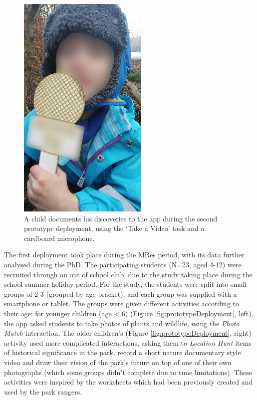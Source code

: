 \begin{figure}
  \centering
  \includegraphics[width=0.35\columnwidth]{images/chapter04/microphone.png}
  \caption[A child completing a `Take a Video' Task]{A child documents his discoveries to the app during the second prototype deployment, using the `Take a Video' task and a cardboard microphone.}
  \label{fig:prototypeMicrophone}
\end{figure}

The first deployment took place during the MRes period, with its data further analysed during the PhD. The participating students (N=23, aged 4-12) were recruited through an out of school club, due to the study taking place during the school summer holiday period. For the study, the students were split into small groups of 2-3 (grouped by age bracket), and each group was supplied with a smartphone or tablet. The groups were given different activities according to their age: for younger children (age < 6) (Figure \ref{fig:prototypeDeployment}, left), the app asked students to take photos of plants and wildlife, using the \textit{Photo Match} interaction. The older children's (Figure \ref{fig:prototypeDeployment}, right) activity used more complicated interactions, asking them to \textit{Location Hunt} items of historical significance in the park, record a short nature documentary style video and draw their vision of the park’s future on top of one of their own photographs (which some groups didn’t complete due to time limitations). These activities were inspired by the worksheets which had been previously created and used by the park rangers.


